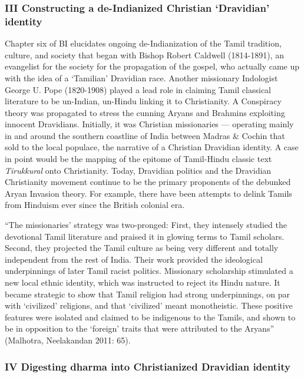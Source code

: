 \subsubsection*{III Constructing a de-Indianized Christian ‘Dravidian’ identity }

Chapter six of BI elucidates ongoing de-Indianization of the Tamil tradition, culture, and society that began with Bishop Robert Caldwell (1814-1891), an evangelist for the society for the propagation of the gospel, who actually came up with the idea of a ‘Tamilian’ Dravidian race. Another missionary Indologist George U. Pope (1820-1908) played a lead role in claiming Tamil classical literature to be un-Indian, un-Hindu linking it to Christianity. A Conspiracy theory was propagated to stress the cunning Aryans and Brahmins exploiting innocent Dravidians. Initially, it was Christian missionaries — operating mainly in and around the southern coastline of India between Madras \& Cochin that sold to the local populace, the narrative of a Christian Dravidian identity. A case in point would be the mapping of the epitome of Tamil-Hindu classic text \textit{Tirukkural} onto Christianity. Today, Dravidian politics and the Dravidian Christianity movement continue to be the primary proponents of the debunked Aryan Invasion theory. For example, there have been attempts to delink Tamils from Hinduism ever since the British colonial era.

\begin{myquote}
“The missionaries’ strategy was two-pronged: First, they intensely studied the devotional Tamil literature and praised it in glowing terms to Tamil scholars. Second, they projected the Tamil culture as being very different and totally independent from the rest of India. Their work provided the ideological underpinnings of later Tamil racist politics. Missionary scholarship stimulated a new local ethnic identity, which was instructed to reject its Hindu nature. It became strategic to show that Tamil religion had strong underpinnings, on par with ‘civilized’ religions, and that ‘civilized’ meant monotheistic. These positive features were isolated and claimed to be indigenous to the Tamils, and shown to be in opposition to the ‘foreign’ traits that were attributed to the Aryans” (Malhotra, Neelakandan 2011: 65).
\end{myquote}


\subsubsection*{IV Digesting dharma into Christianized Dravidian identity}

